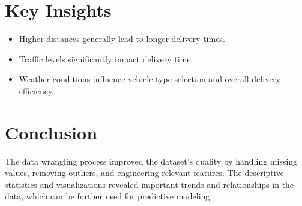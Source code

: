 \documentclass{article}
\begin{document}
\section{Key Insights}
\begin{itemize}
    \item Higher distances generally lead to longer delivery times.
    \item Traffic levels significantly impact delivery time.
    \item Weather conditions influence vehicle type selection and overall delivery efficiency.
\end{itemize}

\section{Conclusion}
The data wrangling process improved the dataset’s quality by handling missing values, removing outliers, and engineering relevant features. The descriptive statistics and visualizations revealed important trends and relationships in the data, which can be further used for predictive modeling.
\end{document}
